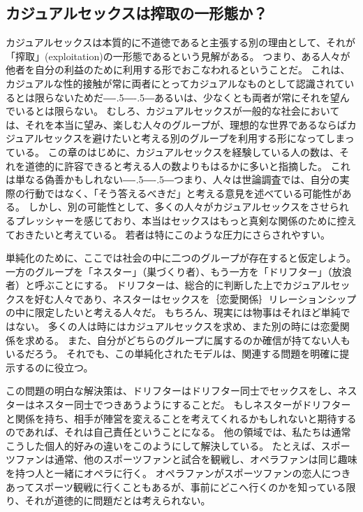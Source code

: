 \documentclass[paper=a4,book,openany]{jlreq}
\def\DDASH{―\kern-.5\zw―\kern-.5\zw―} %
\begin{document}
\subsection{カジュアルセックスは搾取の一形態か？}

カジュアルセックスは本質的に不道徳であると主張する別の理由として、それが「搾取」(exploitation)の一形態であるという見解がある。
つまり、ある人々が他者を自分の利益のために利用する形でおこなわれるということだ。
これは、カジュアルな性的接触が常に両者にとってカジュアルなものとして認識されているとは限らないためだ{\DDASH}あるいは、少なくとも両者が常にそれを望んでいるとは限らない。
むしろ、カジュアルセックスが一般的な社会においては、それを本当に望み、楽しむ人々のグループが、理想的な世界であるならばカジュアルセックスを避けたいと考える別のグループを利用する形になってしまっている。
この章のはじめに、カジュアルセックスを経験している人の数は、それを道徳的に許容できると考える人の数よりもはるかに多いと指摘した。
これは単なる偽善かもしれない{\DDASH}つまり、人々は世論調査では、自分の実際の行動ではなく、「そう答えるべきだ」と考える意見を述べている可能性がある。
しかし、別の可能性として、多くの人々がカジュアルセックスをさせられるプレッシャーを感じており、本当はセックスはもっと真剣な関係のために控えておきたいと考えている。
若者は特にこのような圧力にさらされやすい。

単純化のために、ここでは社会の中に二つのグループが存在すると仮定しよう。
一方のグループを「ネスター」（巣づくり者）、もう一方を「ドリフター」（放浪者）と呼ぶことにする。
ドリフターは、総合的に判断した上でカジュアルセックスを好む人々であり、ネスターはセックスを｛恋愛関係｝{リレーションシップ}の中に限定したいと考える人々だ。
もちろん、現実には物事はそれほど単純ではない。
多くの人は時にはカジュアルセックスを求め、また別の時には恋愛関係を求める。
また、自分がどちらのグループに属するのか確信が持てない人もいるだろう。
それでも、この単純化されたモデルは、関連する問題を明確に提示するのに役立つ。

この問題の明白な解決策は、ドリフターはドリフター同士でセックスをし、ネスターはネスター同士でつきあうようにすることだ。
もしネスターがドリフターと関係を持ち、相手が陣営を変えることを考えてくれるかもしれないと期待するのであれば、それは自己責任ということになる。
他の領域では、私たちは通常こうした個人的好みの違いをこのようにして解決している。
たとえば、スポーツファンは通常、他のスポーツファンと試合を観戦し、オペラファンは同じ趣味を持つ人と一緒にオペラに行く。
オペラファンがスポーツファンの恋人につきあってスポーツ観戦に行くこともあるが、事前にどこへ行くのかを知っている限り、それが道徳的に問題だとは考えられない。
\end{document}
